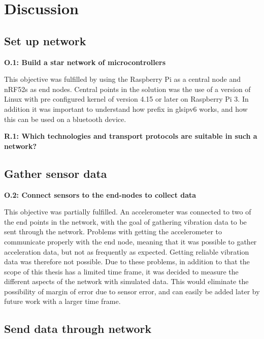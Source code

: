\chapter{Discussion}
\label{chp:dataAnalysis}


\section{Set up network}

\noindent \textbf{O.1: Build a star network of microcontrollers}

This objective was fulfilled by using the Raspberry Pi as a central node and nRF52s as end nodes. Central points in the solution was the use of a version of Linux with pre configured kernel of version 4.15 or later on Raspberry Pi 3. In addition it was important to understand how prefix in gls{ipv6} works, and how this can be used on a bluetooth device.


\noindent \textbf{R.1: Which technologies and transport protocols are suitable in such a network?}


\section{Gather sensor data}

\noindent\textbf{O.2: Connect sensors to the end-nodes to collect data}

This objective was partially fulfilled. An accelerometer was connected to two of the end points in the network, with the goal of gathering vibration data to be sent through the network. Problems with getting the accelerometer to communicate properly with the end node, meaning that it was possible to gather acceleration data, but not as frequently as expected. Getting reliable vibration data was therefore not possible. Due to these problems, in addition to that the scope of this thesis has a limited time frame, it was decided to measure the different aspects of the network with simulated data. This would eliminate the possibility of margin of error due to sensor error, and can easily be added later by future work with a larger time frame. 


\section{Send data through network}

